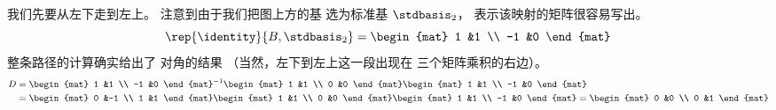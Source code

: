 \begin{exercises}
\begin{answer}
\begin{exparts}
          我们先要从左下走到左上。
          注意到由于我们把图上方的基
          选为标准基 $\stdbasis_2$，
          表示该映射的矩阵很容易写出。
          \begin{equation*}
            \rep{\identity}{B,\stdbasis_2}=
            \begin{mat}
              1 &1 \\
             -1 &0
            \end{mat}
          \end{equation*}
          整条路径的计算确实给出了
          对角的结果
          （当然，左下到左上这一段出现在
          三个矩阵乘积的右边）。
          \begin{align*}
                 D
                 &=
                 \begin{mat}
                    1  &1  \\
                    -1  &0
                 \end{mat}^{-1}
                 \begin{mat}
                    1  &1  \\
                    0  &0
                 \end{mat}
                 \begin{mat}
                    1  &1  \\
                    -1  &0
                 \end{mat}                \\
                 &=
                 \begin{mat}
                    0  &-1  \\
                    1  &1
                 \end{mat}
                 \begin{mat}
                    1  &1  \\
                    0  &0
                 \end{mat}
                 \begin{mat}
                    1  &1  \\
                    -1  &0
                 \end{mat}
                =\begin{mat}
                    0  &0  \\
                    0  &1
                 \end{mat}
          \end{align*}
     \end{exparts}

\end{answer}
\end{exercises}
